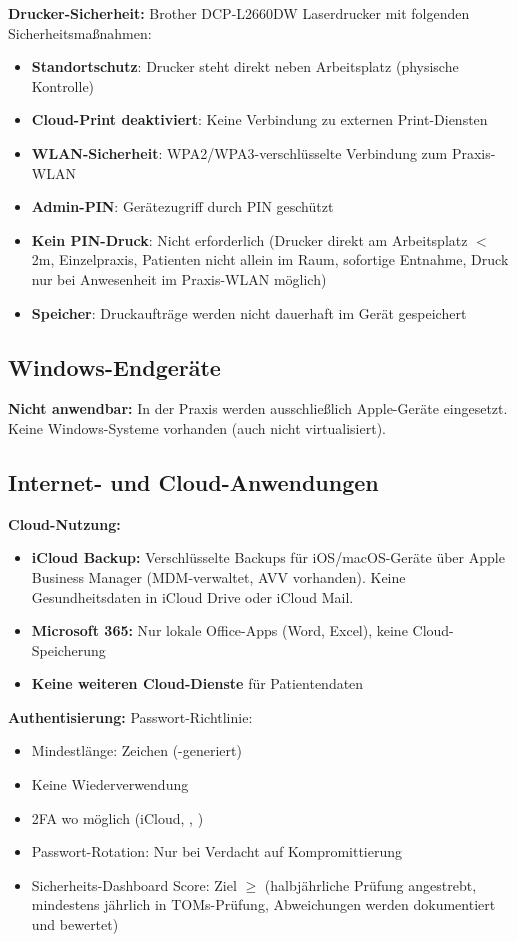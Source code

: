 \textbf{Drucker-Sicherheit:} Brother DCP-L2660DW Laserdrucker mit folgenden Sicherheitsmaßnahmen:
\begin{itemize}
  \item \textbf{Standortschutz}: Drucker steht direkt neben Arbeitsplatz (physische Kontrolle)
  \item \textbf{Cloud-Print deaktiviert}: Keine Verbindung zu externen Print-Diensten
  \item \textbf{WLAN-Sicherheit}: WPA2\slash WPA3-ver\-schlüs\-sel\-te Verbindung zum Praxis-WLAN
  \item \textbf{Admin-PIN}: Gerätezugriff durch PIN geschützt
  \item \textbf{Kein PIN-Druck}: Nicht erforderlich (Drucker direkt am Arbeitsplatz $<$2m,
    Einzelpraxis, Patienten nicht allein im Raum, sofortige Entnahme, Druck nur bei
    Anwesenheit im Praxis-WLAN möglich)
  \item \textbf{Speicher}: Druckaufträge werden nicht dauerhaft im Gerät gespeichert
\end{itemize}

\subsection{Windows-Endgeräte}
\label{sec:windows}

\textbf{Nicht anwendbar:} In der Praxis werden ausschließlich Apple-Geräte eingesetzt.
Keine Windows-Systeme vorhanden (auch nicht virtualisiert).

\subsection{Internet- und Cloud-Anwendungen}
\label{sec:internet}

\textbf{Cloud-Nutzung:}
\begin{itemize}
  \item \textbf{iCloud Backup:} Verschlüsselte Backups für iOS/macOS-Geräte über Apple Business Manager (MDM-verwaltet, AVV vorhanden). Keine Gesundheitsdaten in iCloud Drive oder iCloud Mail.
  \item \textbf{Microsoft 365:} Nur lokale Office-Apps (Word, Excel), keine Cloud-Speicherung
  \item \textbf{Keine weiteren Cloud-Dienste} für Patientendaten
\end{itemize}

\textbf{Authentisierung:} Passwort-Richtlinie:
\begin{itemize}
  \item Mindestlänge: \PasswortMindestlaenge{} Zeichen (\PasswortManager{}-generiert)
  \item Keine Wiederverwendung
  \item 2FA wo möglich (iCloud, \PasswortManager{}, \HostingAnbieter{})
  \item Passwort-Rotation: Nur bei Verdacht auf Kompromittierung
  \item \PasswortManager{} Sicherheits-Dashboard Score: Ziel $\geq$\PasswortSecurityScore{} (halbjährliche Prüfung angestrebt, mindestens jährlich in TOMs-Prüfung, Abweichungen werden dokumentiert und bewertet)
\end{itemize}

